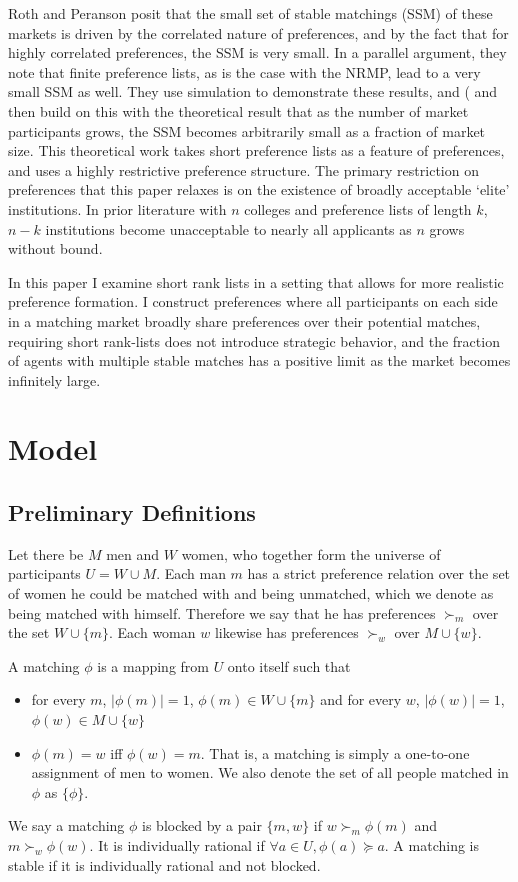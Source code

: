 \documentclass[WP]{AEA}
\begin{document}
Roth and Peranson posit that the small set of stable matchings (SSM) of these markets is driven by the correlated nature of preferences, and by the fact that for highly correlated preferences, the SSM is very small.  In a parallel argument, they note that finite preference lists, as is the case with the NRMP, lead to a very small SSM as well.  They use simulation to demonstrate these results, and (\cite{Immorlica2005} and then \cite{Kojima2009} build on this with the theoretical result that as the number of market participants grows, the SSM becomes arbitrarily small as a fraction of market size. This theoretical work takes short preference lists as a feature of preferences, and uses a highly restrictive preference structure. 
The primary restriction on preferences that this paper relaxes is on the existence of broadly acceptable `elite' institutions. In prior literature with $n$ colleges and preference lists of length $k$, $n-k$ institutions become unacceptable to nearly all applicants as $n$ grows without bound.  

In this paper I examine short rank lists in a setting that allows for more realistic preference formation. I construct preferences where all participants on each side in a matching market broadly share preferences over their potential matches, requiring short rank-lists does not introduce strategic behavior, and the fraction of agents with multiple stable matches has a positive limit as the market becomes infinitely large.


\section{Model}
\subsection{Preliminary Definitions}

Let there be $M$ men and $W$ women, who together form the universe of participants $U = W \cup M$.  Each man $m$ has a strict preference relation over the set of women he could be matched with and being unmatched, which we denote as being matched with himself. Therefore we say that he has preferences $\succ_{m}$ over the set $W \cup \{m\}$. Each woman $w$ likewise has preferences $\succ_w$ over $M \cup \{w\}$. 

A matching $\phi$ is a mapping from $U$ onto itself such that 
\begin{itemize}
	\item for every $m$, $|\phi(m)| = 1$, $\phi(m) \in W \cup \{m\} $ and for every  $w$, $|\phi(w)| = 1$, $\phi(w) \in M \cup \{w\}$
	\item $\phi(m) = w$ iff $\phi(w) = m$.  That is, a matching is simply a one-to-one assignment of men to women. We also denote the set of all people matched in $\phi$ as $\{\phi\}$.
\end{itemize}
We say a matching $\phi$ is blocked by a pair $\{m,w\}$ if $w \succ_m \phi(m)$ and $m \succ_w \phi(w)$. It is individually rational if $\forall a \in U ,\phi(a) \succeq a$. A matching is stable if it is individually rational and not blocked.
\end{document}
